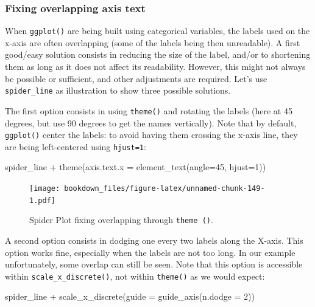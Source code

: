 \documentclass[
]{krantz}
\makeatletter
\newenvironment{Shaded}{\begin{snugshade}}{\end{snugshade}}
\newcommand{\AttributeTok}[1]{\textcolor[rgb]{0.61,0.61,0.61}{#1}}
\newcommand{\DecValTok}[1]{\textcolor[rgb]{0.06,0.06,0.06}{#1}}
\newcommand{\FunctionTok}[1]{\textcolor[rgb]{0,0,0}{#1}}
\newcommand{\NormalTok}[1]{#1}
\newcommand{\SpecialCharTok}[1]{\textcolor[rgb]{0,0,0}{#1}}
\newenvironment{kframe}{%
\medskip{}
\setlength{\fboxsep}{.8em}
 \def\at@end@of@kframe{}%
 \ifinner\ifhmode%
  \def\at@end@of@kframe{\end{minipage}}%
  \begin{minipage}{\columnwidth}%
 \fi\fi%
 \def\FrameCommand##1{\hskip\@totalleftmargin \hskip-\fboxsep
 \colorbox{shadecolor}{##1}\hskip-\fboxsep
     \hskip-\linewidth \hskip-\@totalleftmargin \hskip\columnwidth}%
 \MakeFramed {\advance\hsize-\width
   \@totalleftmargin\z@ \linewidth\hsize
   \@setminipage}}%
 {\par\unskip\endMakeFramed%
 \at@end@of@kframe}
\renewenvironment{Shaded}{\begin{kframe}}{\end{kframe}}
\makeatother
\begin{document}
\hypertarget{overlap}{%
\subsubsection*{Fixing overlapping axis text}\label{overlap}}


When \texttt{ggplot()} are being built using categorical variables, the labels used on the x-axis are often overlapping (some of the labels being then unreadable). A first good/easy solution consists in reducing the size of the label, and/or to shortening them as long as it does not affect its readability. However, this might not always be possible or sufficient, and other adjustments are required. Let's use \texttt{spider\_line} as illustration to show three possible solutions.

The first option consists in using \texttt{theme()} and rotating the labels (here at 45 degrees, but use 90 degrees to get the names vertically). Note that by default, \texttt{ggplot()} center the labels: to avoid having them crossing the x-axis line, they are being left-centered using \texttt{hjust=1}:

\begin{Shaded}
\begin{Highlighting}[]
\NormalTok{spider\_line }\SpecialCharTok{+} 
  \FunctionTok{theme}\NormalTok{(}\AttributeTok{axis.text.x =} \FunctionTok{element\_text}\NormalTok{(}\AttributeTok{angle=}\DecValTok{45}\NormalTok{, }\AttributeTok{hjust=}\DecValTok{1}\NormalTok{))}
\end{Highlighting}
\end{Shaded}

\begin{figure}
\centering
\texttt{[image: bookdown\_files/figure-latex/unnamed-chunk-149-1.pdf]}
\caption{\label{fig:unnamed-chunk-149}Spider Plot fixing overlapping through \texttt{theme\ ()}.}
\end{figure}

A second option consists in dodging one every two labels along the X-axis. This option works fine, especially when the labels are not too long. In our example unfortunately, some overlap can still be seen. Note that this option is accessible within \texttt{scale\_x\_discrete()}, not within \texttt{theme()} as we would expect:

\begin{Shaded}
\begin{Highlighting}[]
\NormalTok{spider\_line }\SpecialCharTok{+} 
  \FunctionTok{scale\_x\_discrete}\NormalTok{(}\AttributeTok{guide =} \FunctionTok{guide\_axis}\NormalTok{(}\AttributeTok{n.dodge =} \DecValTok{2}\NormalTok{))}
\end{Highlighting}
\end{Shaded}
\end{document}
